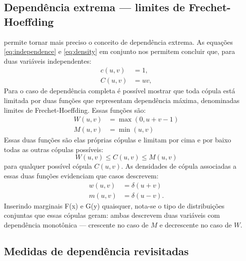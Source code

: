 \subsection{Dependência extrema --- limites de Frechet-Hoeffding}

 permite tornar mais preciso o conceito de dependência extrema. As equações \eqref{eq:independence} e \eqref{eq:density} em conjunto nos permitem concluir que, para duas variáveis independentes:
\begin{align}
c(u,v) &= 1, \\
C(u,v) &= uv,
\end{align}
Para o caso de dependência completa é possível mostrar que\cite{Nelsen2006} toda cópula está limitada por duas funções que representam dependência máxima, denominadas limites de Frechet-Hoeffding. Essas funções são:
\begin{align}
\label{eq:frechethoeffding}
W(u,v) &= \max(0, u+v-1) \\
M(u,v) &= \min(u,v)
\end{align}
Essas duas funções são elas próprias cópulas e limitam por cima e por baixo todas as outras cópulas possíveis:
\begin{equation}
W\left(u,v\right) \le C(u,v) \le M(u,v)  
\end{equation}
para qualquer possível cópula $C(u,v)$. As densidades de cópula associadas a essas duas funções evidenciam que casos descrevem:
\begin{align}
w(u,v) &= \delta(u+v) \\
m(u,v) &= \delta(u-v).
\end{align}
Inserindo marginais F(x) e G(y) quaisquer, nota-se o tipo de distribuições conjuntas que essas cópulas geram: ambas descrevem duas variáveis com dependência monotônica --- crescente no caso de $M$ e decrescente no caso de $W$.

\subsection{Medidas de dependência revisitadas}


